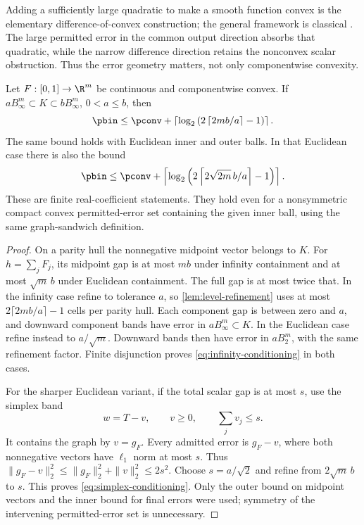 Adding a sufficiently large quadratic to make a smooth function convex
is the elementary difference-of-convex construction; the general framework
is classical \citep{hartman1959}. The large permitted error in the common
output direction absorbs that quadratic, while the narrow difference
direction retains the nonconvex scalar obstruction. Thus the error
geometry matters, not only componentwise convexity.

\begin{proposition}\label{prop:conditioning}
Let $F:[0,1]\to\R^m$ be continuous and componentwise convex.
If $aB_\infty^m\subset K\subset bB_\infty^m$, $0<a\le b$, then
\begin{equation}\label{eq:infinity-conditioning}
 \pbin\le\pconv+
 \left\lceil\log_2\left(2\left\lceil2mb/a\right\rceil-1\right)\right\rceil.
\end{equation}
The same bound holds with Euclidean inner and outer balls. In that
Euclidean case there is also the bound
\begin{equation}\label{eq:simplex-conditioning}
 \pbin\le\pconv+
 \left\lceil\log_2\left(2\left\lceil2\sqrt{2m}\,b/a\right\rceil-1\right)\right\rceil.
\end{equation}
These are finite real-coefficient statements. They hold even for a
nonsymmetric compact convex permitted-error set containing the given
inner ball, using the same graph-sandwich definition.
\end{proposition}
\begin{proof}
On a parity hull the nonnegative midpoint vector belongs to $K$.
For $h=\sum_jF_j$, its midpoint gap is at most $mb$ under infinity
containment and at most $\sqrt m\,b$ under Euclidean containment.
The full gap is at most twice that. In the infinity case refine to
tolerance $a$, so \cref{lem:level-refinement} uses at most
$2\lceil2mb/a\rceil-1$ cells per parity hull. Each component gap
is between zero and $a$, and downward component bands have error in
$aB_\infty^m\subset K$. In the Euclidean case refine instead to
$a/\sqrt m$. Downward bands then have error in $aB_2^m$, with the
same refinement factor. Finite disjunction proves
\eqref{eq:infinity-conditioning} in both cases.

For the sharper Euclidean variant, if the total scalar gap is at most
$s$, use the simplex band
\begin{equation}\label{eq:simplex-band}
 w=T-v,\qquad v\ge0,\qquad \sum_jv_j\le s.
\end{equation}
It contains the graph by $v=g_F$. Every admitted error is $g_F-v$,
where both nonnegative vectors have $\ell_1$ norm at most $s$.
Thus $\|g_F-v\|_2^2\le\|g_F\|_2^2+\|v\|_2^2\le2s^2$.
Choose $s=a/\sqrt2$ and refine from $2\sqrt m\,b$ to $s$.
This proves \eqref{eq:simplex-conditioning}. Only the outer bound
on midpoint vectors and the inner bound for final errors were used;
symmetry of the intervening permitted-error set is unnecessary.
\end{proof}

